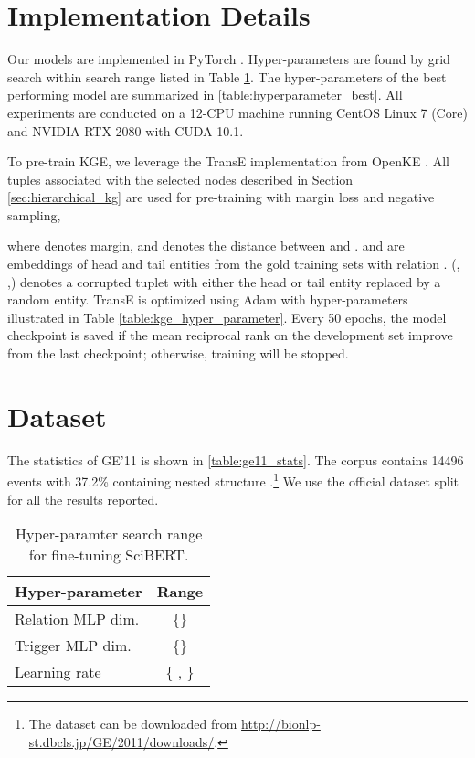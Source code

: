 \documentclass[11pt,a4paper]{article}
\newcommand{\GE}{\textrm{{\fontfamily{qcr}\selectfont GE'11} }}
\begin{document}
\clearpage
\appendix
\appendix

\section{Implementation Details}



Our models are implemented in PyTorch \cite{paszke2019pytorch}. Hyper-parameters are found by grid search within search range listed in Table \ref{table:hyperparameter}. The hyper-parameters of the best performing model are summarized in \ref{table:hyperparameter_best}. All experiments are conducted on a 12-CPU machine running CentOS Linux 7 (Core) and NVIDIA RTX 2080 with CUDA 10.1. 

To pre-train KGE, we leverage the TransE implementation from OpenKE \cite{han2018openke}. All tuples associated with the selected nodes described in Section \ref{sec:hierarchical_kg} are used for pre-training with margin loss and negative sampling,

{
\small

}
where  denotes margin, and  denotes the  distance between  and .  and  are embeddings of head and tail entities from the gold training sets  with relation .  (,   ,) denotes a corrupted tuplet with either the head or tail entity replaced by a random entity. TransE is optimized using Adam \cite{kingma:adam} with hyper-parameters illustrated in Table \ref{table:kge_hyper_parameter}. Every 50 epochs, the model checkpoint is saved if the mean reciprocal rank on the development set improve from the last checkpoint; otherwise, training will be stopped.


\section{Dataset}
The statistics of \GE is shown in \ref{table:ge11_stats}. The corpus contains 14496 events with 37.2\% containing nested structure \cite{bjorne-salakoski-2011-generalizing}.\footnote{The dataset can be downloaded from \href{http://bionlp-st.dbcls.jp/GE/2011/downloads/}{http://bionlp-st.dbcls.jp/GE/2011/downloads/}.} We use the official dataset split for all the results reported.
\begin{table}[h] 
\small
\centering
\begin{tabular}{lc}
\hline 
\textbf{Hyper-parameter}  & \textbf{Range} \\ \hline
Relation MLP dim. & \{\} \\
Trigger MLP dim. & \{\} \\
Learning rate & \{ ,  \} \\


\hline
\end{tabular}
\caption{\label{font-table} Hyper-paramter search range for fine-tuning SciBERT.}
\label{table:hyperparameter}
\end{table}
\end{document}
